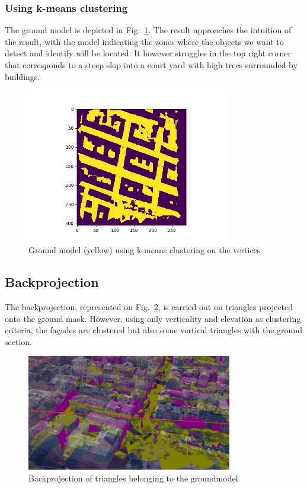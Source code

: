 \documentclass{kththesis}
\begin{document}
\subsubsection{Using k-means clustering}
The ground model is depicted in Fig.~\ref{fig:k-means_gm}. The result approaches the intuition of the result, with the model indicating the zones where the objects we want to detect and identify will be located. It however struggles in the top right corner that corresponds to a steep slop into a court yard with high trees surrounded by buildings. 
\begin{figure}[H]
    \centering
    \includegraphics[width=0.8\textwidth]{images/Results/binary_ground.png}
    \caption{Ground model (yellow) using k-means clustering on the vertices}
    \label{fig:k-means_gm}
\end{figure}
\subsection{Backprojection}
The backprojection, represented on Fig.~\ref{fig:backproj}, is carried out on triangles projected onto the ground mask. However, using only verticality and elevation as clustering criteria, the façades are clustered but also some vertical triangles with the ground section. 
\begin{figure}[H]
    \centering
    \includegraphics[width=0.8\textwidth]{images/Results/3D_triangles_ground.png}
    \caption{Backprojection of triangles belonging to the groundmodel}
    \label{fig:backproj}
\end{figure}
\end{document}
